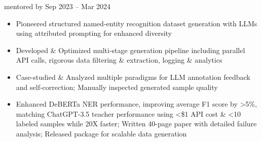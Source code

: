     {{\bodyfontsize \color{body} mentored by} }
    {Sep 2023 -- Mar 2024}{}{}
\begin{itemize}

    \item Pioneered structured named-entity recognition dataset generation with LLMs using attributed prompting for enhanced diversity

    \item Developed \& Optimized multi-stage generation pipeline including parallel API calls, rigorous data filtering \& extraction, logging \& analytics

    \item Case-studied \& Analyzed multiple paradigms for LLM annotation feedback and self-correction; Manually inspected generated sample quality

    \item Enhanced DeBERTa NER performance, improving average F1 score by >5\%, matching ChatGPT-3.5 teacher performance
    using <\$1 API cost \& <10 labeled samples while 20X faster; Written 40-page paper with detailed failure analysis; Released package for scalable data generation
\end{itemize}
\dividerSmall


